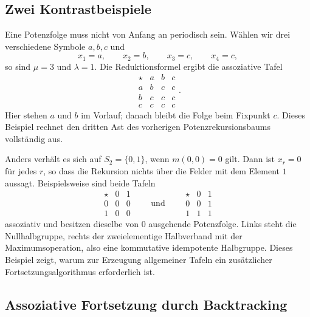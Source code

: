 \documentclass[main.tex]{subfiles}
\begin{document}
\subsection{Zwei Kontrastbeispiele}

Eine Potenzfolge muss nicht von Anfang an periodisch sein.  Wählen wir drei
verschiedene Symbole \(a,b,c\) und
\[
  x_1=a,\qquad x_2=b,\qquad x_3=c,\qquad x_4=c,
\]
so sind \(\mu=3\) und \(\lambda=1\).  Die Reduktionsformel ergibt die
assoziative Tafel
\[
\begin{array}{c|ccc}
\star&a&b&c\\\hline
a&b&c&c\\
b&c&c&c\\
c&c&c&c
\end{array}.
\]
Hier stehen \(a\) und \(b\) im Vorlauf; danach bleibt die Folge beim
Fixpunkt \(c\).  Dieses Beispiel rechnet den dritten Ast des vorherigen
Potenzrekursionsbaums vollständig aus.

Anders verhält es sich auf \(S_2=\{0,1\}\), wenn \(m(0,0)=0\) gilt.  Dann
ist \(x_r=0\) für jedes \(r\), so dass die Rekursion nichts über die Felder
mit dem Element \(1\) aussagt.  Beispielsweise sind beide Tafeln
\[
\begin{array}{c|cc}
\star&0&1\\\hline
0&0&0\\
1&0&0
\end{array}
\qquad\text{und}\qquad
\begin{array}{c|cc}
\star&0&1\\\hline
0&0&1\\
1&1&1
\end{array}
\]
assoziativ und besitzen dieselbe von \(0\) ausgehende Potenzfolge.  Links
steht die Nullhalbgruppe, rechts der zweielementige Halbverband mit der
Maximumsoperation, also eine kommutative idempotente Halbgruppe.  Dieses
Beispiel zeigt, warum zur Erzeugung allgemeiner Tafeln ein zusätzlicher
Fortsetzungsalgorithmus erforderlich ist.


\subsection{Assoziative Fortsetzung durch Backtracking}
\end{document}
